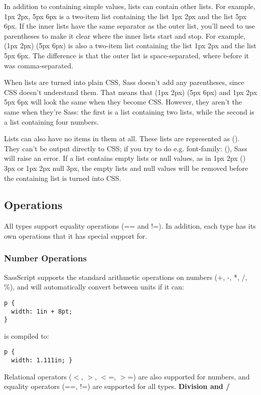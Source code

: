 \documentclass[9pt]{article}
\begin{document}
 In addition to containing simple values, lists can contain other lists. For example, 1px 2px, 5px 6px is a two-item list containing the list 1px 2px and the list 5px 6px. If the inner lists have the same separator as the outer list, you’ll need to use parentheses to make it clear where the inner lists start and stop. For example, (1px 2px) (5px 6px) is also a two-item list containing the list 1px 2px and the list 5px 6px. The difference is that the outer list is space-separated, where before it was comma-separated.


 When lists are turned into plain CSS, Sass doesn’t add any parentheses, since CSS doesn’t understand them. That means that (1px 2px) (5px 6px) and 1px 2px 5px 6px will look the same when they become CSS. However, they aren’t the same when they’re Sass: the first is a list containing two lists, while the second is a list containing four numbers.


 Lists can also have no items in them at all. These lists are represented as (). They can’t be output directly to CSS; if you try to do e.g. font-family: (), Sass will raise an error. If a list contains empty lists or null values, as in 1px 2px () 3px or 1px 2px null 3px, the empty lists and null values will be removed before the containing list is turned into CSS.
\subsection{Operations}


 All types support equality operations (== and !=). In addition, each type has its own operations that it has special support for.
\subsubsection{Number Operations}


 SassScript supports the standard arithmetic operations on numbers (+, -, *, /, \%), and will automatically convert between units if it can:
\begin{verbatim}
p {
  width: 1in + 8pt;
}
\end{verbatim}


 is compiled to:
\begin{verbatim}
p {
  width: 1.111in; }
\end{verbatim}


 Relational operators ($<$, $>$, $<$=, $>$=) are also supported for numbers, and equality operators (==, !=) are supported for all types.
\textbf{Division and /}
\end{document}
